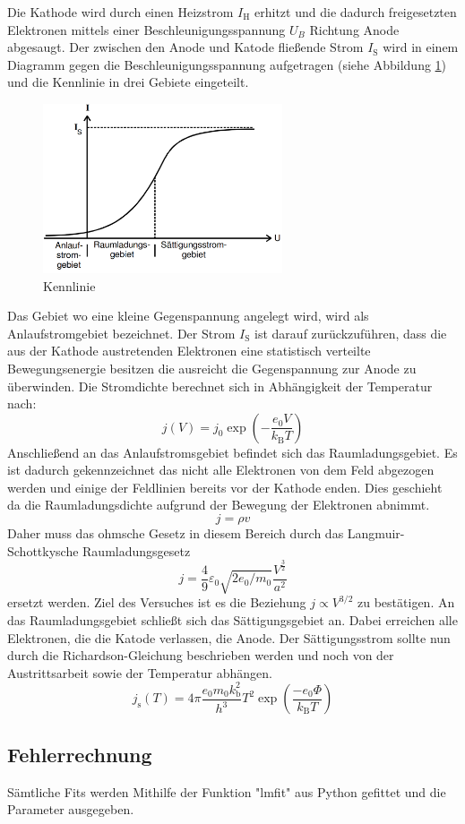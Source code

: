 Die Kathode wird durch einen Heizstrom $I_\text{H}$ erhitzt und die dadurch freigesetzten Elektronen mittels einer Beschleunigungsspannung $U_B$ Richtung Anode abgesaugt. Der zwischen den Anode und Katode fließende Strom $I_\text{S}$ wird in einem Diagramm gegen die Beschleunigungsspannung aufgetragen (siehe Abbildung \ref{fig:Ken}) und die Kennlinie in drei Gebiete eingeteilt.
\begin{figure}
  \centering
  \includegraphics[height=5cm]{picture/Kennlinie.png}
  \caption{Kennlinie \cite{pra}}
  \label{fig:Ken}
\end{figure}
Das Gebiet wo eine kleine Gegenspannung angelegt wird, wird als Anlaufstromgebiet bezeichnet. Der Strom $I_\text{S}$ ist darauf zurückzuführen, dass die aus der Kathode austretenden Elektronen eine statistisch verteilte Bewegungsenergie besitzen die ausreicht die Gegenspannung zur Anode zu überwinden. Die Stromdichte berechnet sich in Abhängigkeit der Temperatur nach:
\begin{equation}
  j(V) = j_0 \exp\left( - \frac{e_0 V}{k_\text{B} T} \right)
  \label{eqn:jv}
\end{equation}
Anschließend an das Anlaufstromsgebiet befindet sich das Raumladungsgebiet. Es ist dadurch gekennzeichnet das nicht alle Elektronen von dem Feld abgezogen werden und einige der Feldlinien bereits vor der Kathode enden. Dies geschieht da die Raumladungsdichte aufgrund der Bewegung der Elektronen abnimmt.
\begin{equation}
  j = \rho v
  \label{eqn:j}
\end{equation}
Daher muss das ohmsche Gesetz in diesem Bereich durch das Langmuir-Schottkysche Raumladungsgesetz
\begin{equation}
  j = \frac{4}{9}\varepsilon_0\sqrt{2e_0/m_0}\frac{V^{\frac{3}{2}}}{a^2}
  \label{eqn:jLS}
\end{equation}
ersetzt werden. Ziel des Versuches ist es die Beziehung $j \propto V^{3/2}$ zu bestätigen.
An das Raumladungsgebiet schließt sich das Sättigungsgebiet an. Dabei erreichen alle  Elektronen, die die Katode verlassen, die Anode. Der Sättigungsstrom sollte nun durch die Richardson-Gleichung beschrieben werden und noch von der Austrittsarbeit sowie der Temperatur abhängen.
\begin{equation}
  j_\text{s} (T) = 4 \pi \frac{e_0 m_0 k_\text{b}^2}{h^3} T^2 \exp \left( \frac{-e_0 \Phi}{k_\text{B} T} \right)
  \label{eqn:js}
\end{equation}

\subsection{Fehlerrechnung}
Sämtliche Fits werden Mithilfe der Funktion "lmfit" aus Python gefittet und die Parameter ausgegeben.
